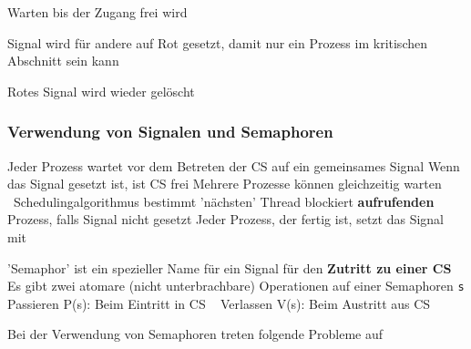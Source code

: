 \begin{minipage}[c]{0.62\columnwidth}
    \raggedright

    \begin{description}
        \setlength\itemsep{2em}
        \item[Zugriffsprüfung:] Warten bis der Zugang frei wird
        \item[Sperren:] Signal wird für andere auf Rot gesetzt, damit nur ein Prozess im kritischen Abschnitt sein kann
        \item[Freigeben:] Rotes Signal wird wieder gelöscht
    \end{description}
\end{minipage}
\hfill
\begin{minipage}[c]{0.37\columnwidth}
    
\end{minipage}


\subsubsection{Verwendung von Signalen und Semaphoren}

\begin{outline}
    \1 Jeder Prozess wartet vor dem Betreten der CS auf ein gemeinsames Signal
        \2 Wenn das Signal gesetzt ist, ist CS frei
        \2 Mehrere Prozesse können gleichzeitig warten \textrightarrow\ Schedulingalgorithmus bestimmt 'nächsten' Thread 
    \1  blockiert \textbf{aufrufenden} Prozess, falls Signal nicht gesetzt
    \1 Jeder Prozess, der fertig ist, setzt das Signal mit 
\end{outline}



\begin{outline}
    \1 'Semaphor' ist ein spezieller Name für ein Signal für den \textbf{Zutritt zu einer CS}
    \1 Es gibt zwei atomare (nicht unterbrachbare) Operationen auf einer Semaphoren \lstinline|s|
        \2 Passieren P(s): Beim Eintritt in CS \textrightarrow\ 
        \2 Verlassen V(s): Beim Austritt aus CS \textrightarrow\ 
\end{outline}

\vspace{0.2cm}

Bei der Verwendung von Semaphoren treten folgende Probleme auf

\vspace{0.1cm}


